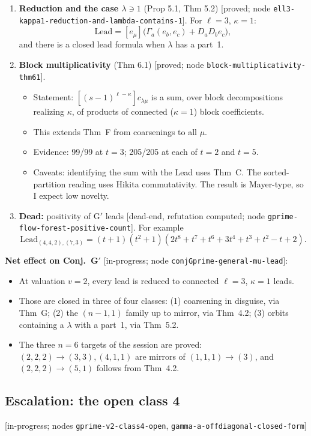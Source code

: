 \documentclass[10pt]{article}
\newcommand{\grade}[1]{\textsf{[#1]}}
\newcommand{\Lead}{\mathrm{Lead}}
\begin{document}
\begin{enumerate}
  Evidence: 20/20 full $(s,t)$ for $n\le6$; 11/11 leads for $n\le10$.
\item \textbf{Reduction and the case $\lambda\ni1$} (Prop 5.1, Thm 5.2)
  \grade{proved; node \texttt{ell3-kappa1-reduction-and-lambda-contains-1}}. For $\ell=3$, $\kappa=1$:
  \[\Lead=[e_\mu]\big(\Gamma_a(e_b,e_c)+D_aD_be_c\big),\]
  and there is a closed lead formula when $\lambda$ has a part~1.
\item \textbf{Block multiplicativity} (Thm 6.1) \grade{proved; node \texttt{block-multiplicativity-thm61}}.
  \begin{itemize}
  \item Statement: $[(s-1)^{\ell-\kappa}]c_{\lambda\mu}$ is a sum, over block decompositions realizing $\kappa$, of
    products of connected ($\kappa=1$) block coefficients.
  \item This extends Thm~F from coarsenings to all $\mu$.
  \item Evidence: 99/99 at $t=3$; 205/205 at each of $t=2$ and $t=5$.
  \item Caveats: identifying the sum with the Lead uses Thm~C. The sorted-partition reading uses Hikita commutativity.
    The result is Mayer-type, so I expect low novelty.
  \end{itemize}
\item \textbf{Dead:} positivity of G$'$ leads \grade{dead-end, refutation computed; node
  \texttt{gprime-flow-forest-positive-count}}. For example
  \[\Lead_{(4,4,2),(7,3)}=(t+1)(t^2+1)(2t^8+t^7+t^6+3t^4+t^3+t^2-t+2).\]
\end{enumerate}
\textbf{Net effect on Conj.~G$'$} \grade{in-progress; node \texttt{conjGprime-general-mu-lead}}:
\begin{itemize}
\item At valuation $v=2$, every lead is reduced to connected $\ell=3$, $\kappa=1$ leads.
\item Those are closed in three of four classes: (1) coarsening in disguise, via Thm~G; (2) the $(n-1,1)$ family up to
  mirror, via Thm~4.2; (3) orbits containing a $\lambda$ with a part~1, via Thm~5.2.
\item The three $n=6$ targets of the session are proved: $(2,2,2)\to(3,3),(4,1,1)$ are mirrors of $(1,1,1)\to(3)$, and
  $(2,2,2)\to(5,1)$ follows from Thm~4.2.
\end{itemize}

\subsection{Escalation: the open class 4}
\grade{in-progress; nodes \texttt{gprime-v2-class4-open}, \texttt{gamma-a-offdiagonal-closed-form}}
\end{document}
